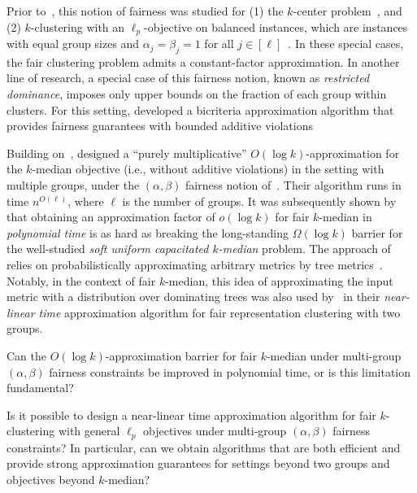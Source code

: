 Prior to~\citep{bera2019fair}, this notion of fairness was studied for (1) the $k$-center problem~\citep{rosner2018privacy}, and (2) $k$-clustering with an $\ell_p$-objective on balanced instances, which are instances with equal group sizes and $\alpha_j = \beta_j = 1$ for all $j \in [\ell]$~\citep{DBLP:journals/orl/BohmFLMS21}. In these special cases, the fair clustering problem admits a constant-factor approximation.
In another line of research, a special case of this fairness notion, known as \emph{restricted dominance}, imposes only upper bounds on the fraction of each group within clusters. For this setting, \citet{ahmadian2019clustering} developed a bicriteria approximation algorithm that provides fairness guarantees with bounded additive violations 

Building on~\citep{bera2019fair,backurs2019scalable}, \citet{DBLP:conf/fat/DaiMV22} designed a ``purely multiplicative'' $O(\log k)$-approximation for the $k$-median objective (i.e., without additive violations) in the setting with multiple groups, under the $(\alpha, \beta)$ fairness notion of~\citep{bera2019fair}. Their algorithm runs in time $n^{O(\ell)}$, where $\ell$ is the number of groups. It was subsequently shown by~\citet{bandyapadhyay2024polynomial} that obtaining an approximation factor of $o(\log k)$ for fair $k$-median in \emph{polynomial time} is as hard as breaking the long-standing $\Omega(\log k)$ barrier for the well-studied \emph{soft uniform capacitated $k$-median} problem. The approach of~\citet{DBLP:conf/fat/DaiMV22} relies on probabilistically approximating arbitrary metrics by tree metrics~\citep{bartal1998approximating,fakcharoenphol2003tight}. Notably, in the context of fair $k$-median, this idea of approximating the input metric with a distribution over dominating trees was also used by~\citet{backurs2019scalable} in their \emph{near-linear time} approximation algorithm for fair representation clustering with two groups.



\begin{question}\label{q:approx-log}
Can the $O(\log k)$-approximation barrier for fair $k$-median under multi-group $(\alpha, \beta)$ fairness constraints be improved in polynomial time, or is this limitation fundamental?
\end{question}
\begin{question}\label{q:near-linear-time}
Is it possible to design a near-linear time approximation algorithm for fair $k$-clustering with general $\ell_p$ objectives under multi-group $(\alpha, \beta)$ fairness constraints? In particular, can we obtain algorithms that are both efficient and provide strong approximation guarantees for settings beyond two groups and objectives beyond $k$-median?
\end{question}
